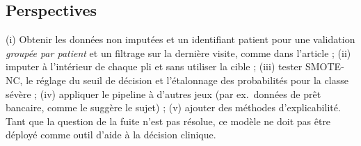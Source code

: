 \subsection{Perspectives}
(i) Obtenir les données non imputées et un identifiant patient pour une validation \emph{groupée par patient} et un filtrage sur la dernière visite, comme dans l'article ; (ii) imputer à l'intérieur de chaque pli et sans utiliser la cible ; (iii) tester SMOTE-NC, le réglage du seuil de décision et l'étalonnage des probabilités pour la classe sévère ; (iv) appliquer le pipeline à d'autres jeux (par ex.\ données de prêt bancaire, comme le suggère le sujet) ; (v) ajouter des méthodes d'explicabilité. Tant que la question de la fuite n'est pas résolue, ce modèle ne doit pas être déployé comme outil d'aide à la décision clinique.
